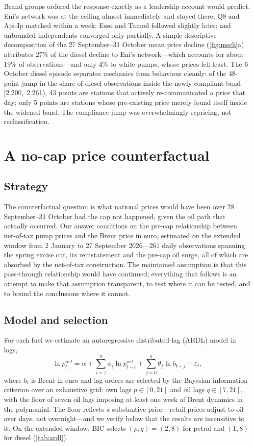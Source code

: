 \documentclass[11pt]{article}
\begin{document}
Brand groups ordered the response exactly as a leadership account would
predict. Eni's network was at the ceiling almost immediately and stayed
there; Q8 and Api-Ip matched within a week; Esso and Tamoil followed
slightly later; and unbranded independents converged only partially.
A simple descriptive decomposition of the 27 September--31 October mean
price decline (\cref{fig:mech}a) attributes 27\% of the diesel decline to
Eni's network---which accounts for about 19\% of observations---and only
4\% to white pumps, whose prices fell least. The 6 October diesel episode
separates mechanics from behaviour cleanly: of the 48-point jump in the
share of diesel observations inside the newly compliant band
[2.200,~2.261), 43 points are stations that actively re-communicated a
price that day; only 5 points are stations whose pre-existing price
merely found itself inside the widened band. The compliance jump was
overwhelmingly repricing, not reclassification.

\section{A no-cap price counterfactual}\label{sec:counterfactual}

\subsection{Strategy}

The counterfactual question is what national prices would have been over
28 September--31 October had the cap not happened, given the oil path that
actually occurred. Our answer conditions on the pre-cap relationship
between net-of-tax pump prices and the Brent price in euro, estimated on
the extended window from 2 January to 27 September 2026---261 daily
observations spanning the spring excise cut, its reinstatement and the
pre-cap oil surge, all of which are absorbed by the net-of-tax
construction. The maintained assumption is that this pass-through
relationship would have continued; everything that follows is an attempt
to make that assumption transparent, to test where it can be tested, and
to bound the conclusions where it cannot.

\subsection{Model and selection}

For each fuel we estimate an autoregressive distributed-lag (ARDL) model
in logs,
\[
\ln p^{net}_t = \alpha + \sum_{i=1}^{q}\phi_i \ln p^{net}_{t-i}
+ \sum_{j=0}^{q}\theta_j \ln b_{t-j} + \varepsilon_t,
\]
where $b_t$ is Brent in euro and lag orders are selected by the Bayesian
information criterion over an exhaustive grid: own lags $p \in [0,21]$ and
oil lags $q \in [7,21]$, with the floor of seven oil lags imposing at
least one week of Brent dynamics in the polynomial. The floor reflects a
substantive prior---retail prices adjust to oil over days, not
overnight---and we verify below that the results are insensitive to it.
On the extended window, BIC selects $(p,q) = (2,8)$ for petrol and
$(1,8)$ for diesel (\cref{tab:ardl}).
\end{document}

